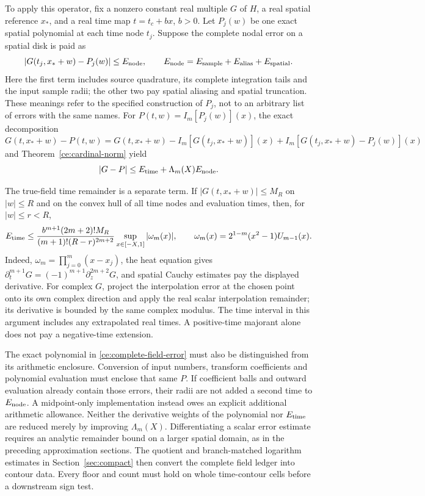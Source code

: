 To apply this operator, fix a nonzero constant real multiple $G$ of $H$,
a real spatial reference $x_*$, and a real time map $t=t_c+b x$, $b>0$.
Let $P_j(w)$ be one exact spatial polynomial at each time node $t_j$.
Suppose the complete nodal error on a spatial disk is paid as
\begin{equation}
 |G(t_j,x_*+w)-P_j(w)|\le E_{\rm node},\qquad
 E_{\rm node}=E_{\rm sample}+E_{\rm alias}+E_{\rm spatial}.
 \label{ce:source-ledger}
\end{equation}
Here the first term includes source quadrature, its complete integration
tails and the input sample radii; the other two pay spatial aliasing and
spatial truncation. These meanings refer to the specified construction of
$P_j$, not to an arbitrary list of errors with the same names.
For $P(t,w)=I_m[P_j(w)](x)$, the exact decomposition
\[
 G(t,x_*+w)-P(t,w)
 =G(t,x_*+w)-I_m[G(t_j,x_*+w)](x)
   +I_m[G(t_j,x_*+w)-P_j(w)](x)
\]
and Theorem~\ref{ce:cardinal-norm} yield
\begin{equation}
 |G-P|\le E_{\rm time}+\Lambda_m(X)E_{\rm node}.
 \label{ce:complete-field-error}
\end{equation}

The true-field time remainder is a separate term. If
$|G(t,x_*+w)|\le M_R$ on $|w|\le R$ and on the convex hull of all time
nodes and evaluation times, then, for $|w|\le r<R$,
\begin{equation}
 E_{\rm time}\le
 \frac{b^{m+1}(2m+2)!M_R}{(m+1)!(R-r)^{2m+2}}
 \sup_{x\in[-X,1]}|\omega_m(x)|,
 \qquad
 \omega_m(x)=2^{1-m}(x^2-1)U_{m-1}(x).
 \label{ce:time-remainder}
\end{equation}
Indeed, $\omega_m=\prod_{j=0}^m(x-x_j)$, the heat equation gives
$\partial_t^{m+1}G=(-1)^{m+1}\partial_z^{2m+2}G$, and spatial
Cauchy estimates pay the displayed derivative. For complex $G$, project
the interpolation error at the chosen point onto its own complex
direction and apply the real scalar interpolation remainder; its
derivative is bounded by the same complex modulus. The time interval in
this argument includes any extrapolated real times. A positive-time
majorant alone does not pay a negative-time extension.

The exact polynomial in \eqref{ce:complete-field-error} must also be
distinguished from its arithmetic enclosure. Conversion of input numbers,
transform coefficients and polynomial evaluation must enclose that same
$P$. If coefficient balls and outward evaluation already contain those
errors, their radii are not added a second time to $E_{\rm node}$.
A midpoint-only implementation instead owes an explicit additional
arithmetic allowance. Neither the derivative weights of the polynomial
nor $E_{\rm time}$ are reduced merely by improving $\Lambda_m(X)$.
Differentiating a scalar error estimate requires an analytic remainder
bound on a larger spatial domain, as in the preceding approximation
sections. The quotient and branch-matched logarithm estimates in
Section~\ref{sec:compact} then convert the complete field ledger into
contour data. Every floor and count must hold on whole time-contour
cells before a downstream sign test.

